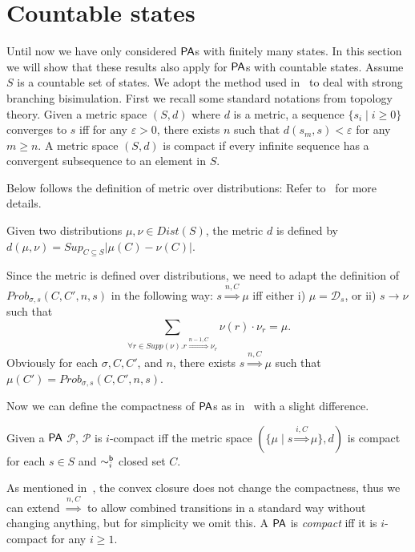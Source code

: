 \documentclass{LMCS}
\def\epsilon{\varepsilon}
\newcommand{\TRAN}[2]{#1\rightarrow #2}
\newcommand{\PA}{{\sf PA}}
\newcommand{\boundTRAN}[2]{\overset{#1,#2}{\Longrightarrow}}
\newcommand{\iBSB}[1]{\sim_{#1}^{{\sf b}}}
\newcommand{\MC}[1]{\mathcal{#1}}
\newcommand{\DIRAC}[1]{\mathcal{D}_{#1}}
\newcommand{\MEASURE}{\mathit{Prob}}
\newcommand{\SUP}{\mathit{Sup}}
\newcommand{\ABS}[1]{|#1|}
\newcommand{\SUPP}{\mathit{Supp}}
\begin{document}
\section{Countable states}\label{sec:countable}
Until now we have only considered $\PA$s with finitely many states. In this section we will show that these results also apply for $\PA$s with countable states.
Assume $S$ is a countable set of states.
We adopt the method used in~\cite{DesharnaisGJP10} to deal with strong branching bisimulation. First we recall some standard notations from topology theory. Given a metric space $(S,d)$ where $d$ is a metric, a sequence $\{s_i\mid i\geq 0\}$ converges to $s$ iff for any $\epsilon>0$, there exists $n$ such that $d(s_m,s)<\epsilon$ for any $m\geq n$. A metric space $(S,d)$ is compact if every infinite sequence has a convergent subsequence to an element in $S$.

Below follows the definition of metric over distributions: Refer to~\cite{DesharnaisGJP10} for more details.
\begin{defi}\label{def:metric}
Given two distributions $\mu,\nu\in\mathit{Dist}(S)$, the metric $d$ is defined by $d(\mu,\nu)=\SUP_{C\subseteq S}\ABS{\mu(C)-\nu(C)}$.
\end{defi}

Since the metric is defined over distributions, we need to adapt the
definition of $\MEASURE_{\sigma,s}(C,C',n,s)$ in the following way:
$s\boundTRAN{n}{C}\mu$ iff either i) $\mu=\DIRAC{s}$, or ii)
$s\TRAN{}\nu$ such that $$\sum\limits_{\forall
  r\in\SUPP(\nu).r\boundTRAN{n-1}{C}\nu_r}\nu(r)\cdot\nu_r=\mu.$$ Obviously for each $\sigma,C,C'$, and $n$, there exists
$s\boundTRAN{n}{C}\mu$ such that
$\mu(C')=\MEASURE_{\sigma,s}(C,C',n,s)$.

Now we can define the compactness of $\PA$s as in~\cite{DesharnaisGJP10} with a slight difference.
\begin{defi}\label{def:compactness}
Given a $\PA$ $\MC{P}$, $\MC{P}$ is $i$-compact iff the metric space $(\{\mu\mid s\boundTRAN{i}{C}\mu\},d)$ is compact for each $s\in S$ and $\iBSB{i}$ closed set $C$.
\end{defi}

As mentioned in~\cite{DesharnaisGJP10,schaefer1999topological}, the convex closure does not change the compactness, thus we can extend $\boundTRAN{n}{C}$ to allow combined transitions in a standard way without changing anything, but for simplicity we omit this. A $\PA$ is \emph{compact} iff it is $i$-compact for any $i\geq 1$.
\end{document}
